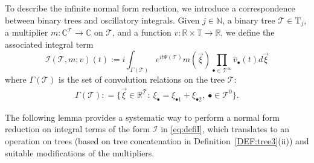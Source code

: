 \documentclass[%
11pt,  reqno]{amsart}
\newcommand{\5}{\textup{V}}
\newcommand{\ft}{\widehat}
\theoremstyle{remark}
\newcommand{\R}{\mathbb{R}}
\newcommand{\bbC}{\mathbb{C}}
\newcommand{\T}{\mathbb{T}}
\newcommand{\bul}{\bullet}
\newcommand{\TT}{\mathcal{T}}
\newcommand{\Tr}{\mathrm{T}}
\newcommand{\G}{\Gamma}
\newcommand{\N}{\mathbb{N}}
\newcommand{\B}{\mathcal{B}}
\newcommand{\Ical}{\mathcal{I}}
\numberwithin{equation}{section}
\numberwithin{theorem}{section}
\begin{document}
To describe the infinite normal form reduction, we introduce a correspondence between binary trees and oscillatory integrals. 
Given $j\in\N$, a binary tree $\TT \in \Tr_j$, a multiplier $m:\bbC^{\TT}\to \bbC$ on $\TT$, and a
function $v: \R\times \T \to\R$, we define the associated integral term
\begin{equation}\label{eq:defiI}
\Ical(\TT, m; v)(t) :=   i \int_{\G(\TT)}
e^{it\Psi(\TT)}m(\vec{\xi})
\prod_{\bul\in \TT^\infty}  \ft v_\bul (t) d\vec{\xi}
\end{equation}
where $\G(\TT)$ is the set of convolution relations on the tree $\TT$:
\begin{align}
\label{Gamma}
\G(\TT) : = \big\{ \vec\xi \in \R^\TT: \ \xi_\bul = \xi_{\bul1} + \xi_{\bul2}, \ \bul \in \TT^0 \big\}. 
\end{align}



The following lemma provides a systematic way to perform a normal form reduction on integral terms of the form $\Ical$ in \eqref{eq:defiI}, which translates to an operation on trees (based on tree concatenation in Definition~\ref{DEF:tree3}(ii)) and suitable modifications of the multipliers. 
\end{document}
